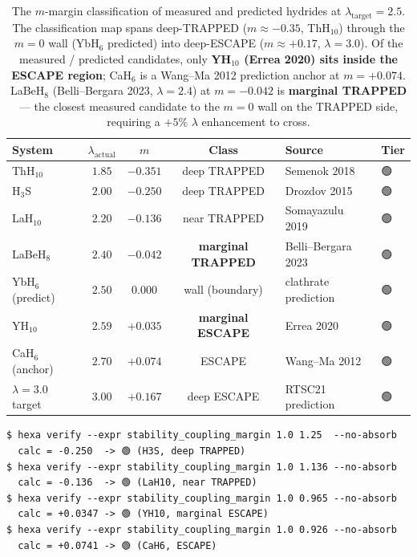\documentclass[11pt,a4paper]{article}
\providecommand{\tierGreen}{🟢}
\begin{document}
\begin{table}[h]
\centering
\small
\begin{tabular}{@{}lcccll@{}}
\toprule
\textbf{System} & $\lambda_{\text{actual}}$ & $m$ & \textbf{Class} & \textbf{Source} & \textbf{Tier} \\
\midrule
ThH$_{10}$        & $1.85$ & $-0.351$ & deep TRAPPED               & Semenok 2018                          & \tierGreen \\
H$_3$S            & $2.00$ & $-0.250$ & deep TRAPPED               & Drozdov 2015~\cite{drozdov2015}       & \tierGreen \\
LaH$_{10}$        & $2.20$ & $-0.136$ & near TRAPPED               & Somayazulu 2019~\cite{somayazulu2019} & \tierGreen \\
LaBeH$_8$         & $2.40$ & $-0.042$ & \textbf{marginal TRAPPED}  & Belli--Bergara 2023                   & \tierGreen \\
YbH$_6$ (predict) & $2.50$ & $0.000$  & wall (boundary)            & clathrate prediction                  & \tierGreen \\
YH$_{10}$         & $2.59$ & $+0.035$ & \textbf{marginal ESCAPE}   & Errea 2020~\cite{errea2020}           & \tierGreen \\
CaH$_6$ (anchor)  & $2.70$ & $+0.074$ & ESCAPE                     & Wang--Ma 2012~\cite{wangMa2012}       & \tierGreen \\
$\lambda=3.0$ target & $3.00$ & $+0.167$ & deep ESCAPE             & RTSC21 prediction                     & \tierGreen \\
\bottomrule
\end{tabular}
\caption{The $m$-margin classification of measured and predicted
hydrides at $\lambda_{\text{target}}=2.5$. The classification map
spans deep-TRAPPED ($m\approx -0.35$, ThH$_{10}$) through the
$m=0$ wall (YbH$_6$ predicted) into deep-ESCAPE
($m\approx +0.17$, $\lambda=3.0$). Of the measured / predicted
candidates, only \textbf{YH$_{10}$ (Errea 2020) sits inside the ESCAPE
region}; CaH$_6$ is a Wang--Ma 2012 prediction anchor at $m=+0.074$.
LaBeH$_8$ (Belli--Bergara 2023, $\lambda=2.4$) at $m=-0.042$ is
\textbf{marginal TRAPPED} --- the closest measured candidate to the
$m=0$ wall on the TRAPPED side, requiring a $+5\%$ $\lambda$
enhancement to cross.}
\label{tab:m-classification}
\end{table}

\begin{lstlisting}[basicstyle=\ttfamily\small,frame=single,xleftmargin=0pt]
$ hexa verify --expr stability_coupling_margin 1.0 1.25  --no-absorb
  calc = -0.250  -> 🟢 (H3S, deep TRAPPED)
$ hexa verify --expr stability_coupling_margin 1.0 1.136 --no-absorb
  calc = -0.136  -> 🟢 (LaH10, near TRAPPED)
$ hexa verify --expr stability_coupling_margin 1.0 0.965 --no-absorb
  calc = +0.0347 -> 🟢 (YH10, marginal ESCAPE)
$ hexa verify --expr stability_coupling_margin 1.0 0.926 --no-absorb
  calc = +0.0741 -> 🟢 (CaH6, ESCAPE)
\end{lstlisting}
\end{document}
